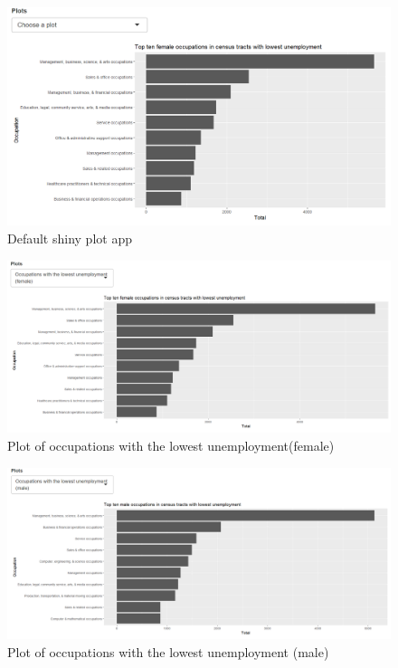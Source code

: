 \documentclass[
  krantz2]{krantz}
\begin{document}
\begin{figure}
\centering
\includegraphics{images/shiny_app6.png}
\caption{Default shiny plot app}
\end{figure}

\begin{figure}
\centering
\includegraphics{images/shiny_app7.png}
\caption{Plot of occupations with the lowest unemployment(female)}
\end{figure}

\begin{figure}
\centering
\includegraphics{images/shiny_app8.png}
\caption{Plot of occupations with the lowest unemployment (male)}
\end{figure}
\end{document}
